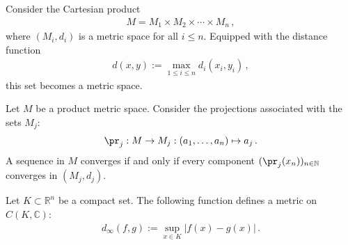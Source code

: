     \begin{example}
        Consider the Cartesian product
        \begin{gather*}
            M = M_1\times M_2\times\cdots\times M_n\,,
        \end{gather*}
        where $(M_i,d_i)$ is a metric space for all $i\leq n$. Equipped with the distance function
        \begin{gather}
            d(x,y) := \max_{1\leq i\leq n}d_i(x_i,y_i)\,,
        \end{gather}
        this set becomes a metric space.
    \end{example}
    \begin{property}\label{metric:projection}
        Let $M$ be a product metric space. Consider the projections associated with the sets $M_j$:
        \begin{gather}
            \pr_j:M\rightarrow M_j:(a_1,\ldots,a_n)\mapsto a_j\,.
        \end{gather}
        A sequence in $M$ converges if and only if every component $(\pr_j(x_n))_{n\in\mathbb{N}}$ converges in $(M_j,d_j)$.
    \end{property}

    \begin{example}\label{metric:supremum_distance}
        Let $K\subset\mathbb{R}^n$ be a compact set. The following function defines a metric on $C(K,\mathbb{C})$:
        \begin{gather}
            d_\infty(f,g) := \sup_{x\in K}|f(x) - g(x)|\,.
        \end{gather}
    \end{example}

